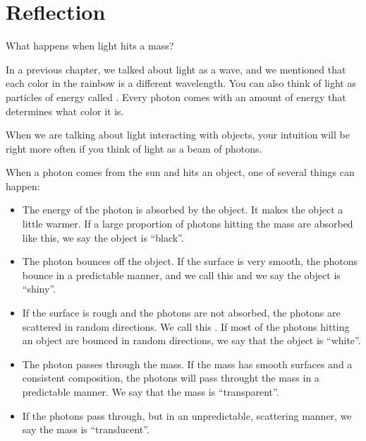 \chapter{Reflection}

What happens when light hits a mass?

In a previous chapter, we talked about light as a wave, and we
mentioned that each color in the rainbow is a different
wavelength. You can also think of light as particles of energy called
. Every photon comes with an amount of energy
that determines what color it is.

When we are talking about light interacting with objects, your
intuition will be right more often if you think of light as a beam of
photons.

When a photon comes from the sun and hits an object, one of several
things can happen:

\begin{itemize}
  
  \item The energy of the photon is absorbed by the object. It makes the
    object a little warmer. If a large proportion of photons hitting the
    mass are absorbed like this, we say the object is ``black''.

 \item The photon bounces off the object.  If the surface is very
   smooth, the photons bounce in a predictable manner, and we call
   this  and we say the object is ``shiny''.

 \item If the surface is rough and the photons are not absorbed, the
   photons are scattered in random directions.  We call this
   .  If most of the photons hitting an object are
   bounced in random directions, we say that the object is ``white''.

 \item The photon passes through the mass.  If the mass has smooth
   surfaces and a consistent composition, the photons will pass throught the
   mass in a predictable manner.  We say that the mass is ``transparent''.

 \item If the photons pass through, but in an unpredictable,
   scattering manner, we say the mass is ``translucent''. 

\end{itemize}


